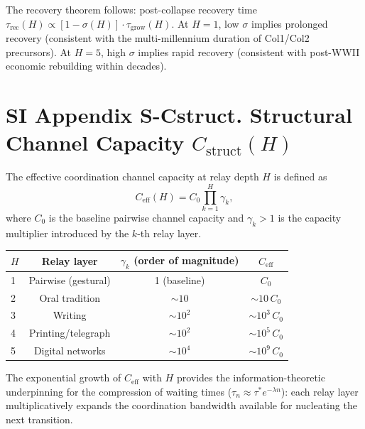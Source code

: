 \documentclass[11pt]{article}
\begin{document}
The recovery theorem follows: post-collapse recovery time $\tau_{\mathrm{rec}}(H) \propto [1 - \sigma(H)] \cdot \tau_{\mathrm{grow}}(H)$.
At $H=1$, low $\sigma$ implies prolonged recovery (consistent with the multi-millennium duration of Col1/Col2 precursors).
At $H=5$, high $\sigma$ implies rapid recovery (consistent with post-WWII economic rebuilding within decades).


\section*{SI Appendix S-Cstruct. Structural Channel Capacity $C_{\mathrm{struct}}(H)$}

The effective coordination channel capacity at relay depth $H$ is defined as
\[
C_{\mathrm{eff}}(H) = C_0 \prod_{k=1}^{H} \gamma_k,
\]
where $C_0$ is the baseline pairwise channel capacity and $\gamma_k > 1$ is the capacity multiplier introduced by the $k$-th relay layer.

\begin{center}
\begin{tabular}{lccc}
\toprule
$H$ & Relay layer & $\gamma_k$ (order of magnitude) & $C_{\mathrm{eff}}$ \\
\midrule
1 & Pairwise (gestural) & 1 (baseline) & $C_0$ \\
2 & Oral tradition & $\sim 10$ & $\sim 10\,C_0$ \\
3 & Writing & $\sim 10^2$ & $\sim 10^3\,C_0$ \\
4 & Printing/telegraph & $\sim 10^2$ & $\sim 10^5\,C_0$ \\
5 & Digital networks & $\sim 10^4$ & $\sim 10^9\,C_0$ \\
\bottomrule
\end{tabular}
\end{center}

The exponential growth of $C_{\mathrm{eff}}$ with $H$ provides the information-theoretic underpinning for the compression of waiting times ($\tau_n \approx \tau^* e^{-\lambda n}$): each relay layer multiplicatively expands the coordination bandwidth available for nucleating the next transition.

\end{document}
